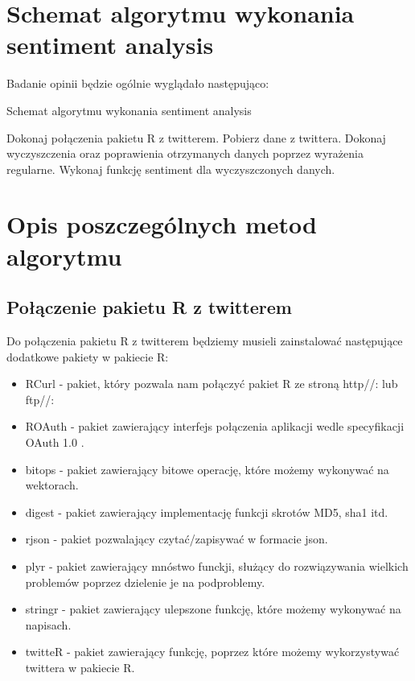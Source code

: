 \documentclass[12pt,a4paper]{report}
\begin{document}
\section[Schemat algorytmu wykonania sentiment analysis] {Schemat algorytmu wykonania sentiment analysis}
Badanie opinii będzie ogólnie wyglądało następująco: \\

\begin{algorithm}
\caption{Schemat algorytmu wykonania sentiment analysis}
\begin{algorithmic}[1]

    \State Dokonaj połączenia pakietu R z twitterem.
    \State Pobierz dane z twittera.
    \State Dokonaj wyczyszczenia oraz poprawienia otrzymanych danych poprzez wyrażenia regularne.
    \State Wykonaj funkcję sentiment dla wyczyszczonych danych.
\EndProcedure
\end{algorithmic}
\end{algorithm}

\section[Opis poszczególnych metod algorytmu]{Opis poszczególnych metod algorytmu}
\subsection[Połączenie pakietu R z twitterem] {Połączenie pakietu R z twitterem}
Do połączenia pakietu R z twitterem będziemy musieli zainstalować następujące dodatkowe pakiety w pakiecie R: 
\begin{itemize}
\item RCurl - pakiet, który pozwala nam połączyć pakiet R ze stroną http//: lub ftp//:
\item ROAuth - pakiet zawierający interfejs połączenia aplikacji wedle specyfikacji OAuth 1.0 .
\item bitops - pakiet zawierający bitowe operację, które możemy wykonywać na wektorach.
\item digest - pakiet zawierający implementację funkcji skrotów MD5, sha1 itd. 
\item rjson - pakiet pozwalający czytać/zapisywać w formacie json. 
\item plyr - pakiet zawierający mnóstwo funckji, służący do rozwiązywania wielkich problemów poprzez dzielenie je na podproblemy. 
\item stringr - pakiet zawierający ulepszone funkcję, które możemy wykonywać na napisach.
\item twitteR - pakiet zawierający funkcję, poprzez które możemy wykorzystywać twittera w pakiecie R.
\end{itemize}
\end{document}
